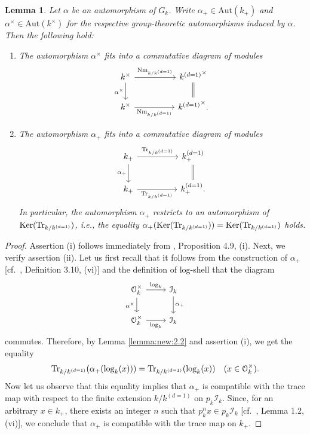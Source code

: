 \documentclass[12pt,showkeys]{amsart}
\theoremstyle{theorem}
\newtheorem{lem}[theorem]{Lemma}
\theoremstyle{definition}
\def\CalI{{\mathcal I}}
\begin{document}
\begin{lem}\label{lemma:2.2}
Let $\alpha$ be an automorphism of $G_k$.  Write $\alpha_+ \in \mathrm{Aut}(k_+)$ and $\alpha^{\times} \in \mathrm{Aut}(k^{\times})$ for the respective group-theoretic automorphisms induced by $\alpha$. Then the following hold:
\begin{enumerate}[label=(\roman*),ref=(\roman*)]
   \item[\rm (i)] The automorphism $\alpha^\times$ fits into a commutative diagram of modules
\[
\begin{tikzcd}
k^\times \arrow[rr, "{\rm Nm}_{k/k^{(d=1)}}"] \arrow[d, "\alpha^\times"'] && {k^{(d=1)}}^\times \arrow[d, equal] \\
k^\times \arrow[rr, "{\rm Nm}_{k/k^{(d=1)}}"']                         && {k^{(d=1)}}^\times.                
\end{tikzcd}
\]\label{lemma:2.2:statement:1}
   \item[\rm (ii)] The automorphism $\alpha_{+}$ fits into a commutative diagram of modules
\[
\begin{tikzcd}
k_{+} \arrow[rr, "{\rm Tr}_{k/k^{(d=1)}}"] \arrow[d, "\alpha_{+}"'] && k^{(d=1)}_+ \arrow[d, equal] \\
k_{+} \arrow[rr, "{\rm Tr}_{k/k^{(d=1)}}"']                         && k^{(d=1)}_+.                
\end{tikzcd}
\]
In particular, the automorphism $\alpha_+$ restricts to an  automorphism of \ ${\rm Ker}({\rm Tr}_{k/k^{(d=1)}})$, i.e., the equality $\alpha_+({\rm Ker}({\rm Tr}_{k/k^{(d=1)}})) = {\rm Ker}({\rm Tr}_{k/k^{(d=1)}})$ holds.
\end{enumerate} \label{lemma:2.2:statement:2}
\end{lem}

\begin{proof}
Assertion (i) follows immediately from \cite{Hoshi2}, Proposition 4.9, (i). 
Next, we verify assertion (ii). 
Let us first recall that it follows from  the construction of $\alpha_+$ [cf.\ \cite{Hoshi1}, Definition 3.10, (vi)] and the definition of log-shell that the diagram
\[
\begin{tikzcd}
\mathcal{O}_k^{\times} \arrow[r, "{\rm log}_k"] \arrow[d, "\alpha^{\times}"'] & \CalI_k \arrow[d, "\alpha_{+}"] \\
\mathcal{O}_k^{\times} \arrow[r, "{\rm log}_k"']                              & \CalI_k             
\end{tikzcd}
\]
commutes.
Therefore, by Lemma \ref{lemma:new:2.2} and assertion (i), we get the equality 
\[
{\rm Tr}_{k/k^{(d=1)}}(\alpha_+(\log_k(x))) = {\rm Tr}_{k/k^{(d=1)}}(\log_k(x)) \ \ \ (x \in \mathcal{O}_k^\times).  
\]
Now let us observe that this equality implies that $\alpha_{+}$ is compatible with the trace map with respect to the finite extension $k/k^{(d=1)}$ on $p_k \mathcal{I}_k$. 
Since, for an arbitrary $x \in k_+$, there exists an integer $n$ such that $p_k^{n}x \in p_k \mathcal{I}_k$ [cf.\ \cite{Hoshi1}, Lemma 1.2, (vi)], we conclude that $\alpha_{+} $ is compatible with the trace map on $k_{+}$. 
\end{proof}
\end{document}
